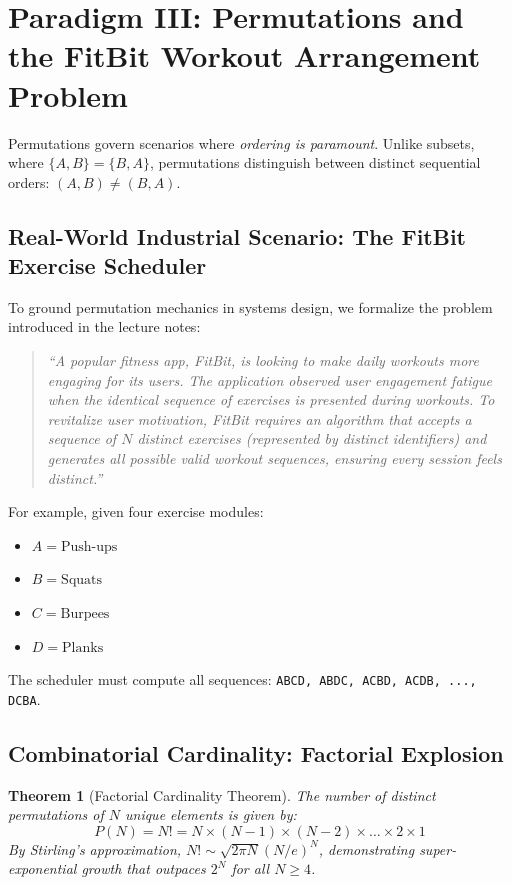 \documentclass[10pt,journal,compsoc,onecolumn]{IEEEtran}
\newtheorem{theorem}{Theorem}
\begin{document}
\section{Paradigm III: Permutations and the FitBit Workout Arrangement Problem}
\label{sec:permutations}

Permutations govern scenarios where \textit{ordering is paramount}. Unlike subsets, where $\{A, B\} = \{B, A\}$, permutations distinguish between distinct sequential orders: $(A, B) \neq (B, A)$.

\subsection{Real-World Industrial Scenario: The FitBit Exercise Scheduler}
To ground permutation mechanics in systems design, we formalize the problem introduced in the lecture notes:
\begin{quote}
\textit{``A popular fitness app, FitBit, is looking to make daily workouts more engaging for its users. The application observed user engagement fatigue when the identical sequence of exercises is presented during workouts. To revitalize user motivation, FitBit requires an algorithm that accepts a sequence of $N$ distinct exercises (represented by distinct identifiers) and generates all possible valid workout sequences, ensuring every session feels distinct.''}
\end{quote}

For example, given four exercise modules:
\begin{itemize}
    \item $A = \text{Push-ups}$
    \item $B = \text{Squats}$
    \item $C = \text{Burpees}$
    \item $D = \text{Planks}$
\end{itemize}
The scheduler must compute all sequences: \texttt{ABCD, ABDC, ACBD, ACDB, ..., DCBA}.

\subsection{Combinatorial Cardinality: Factorial Explosion}
\begin{theorem}[Factorial Cardinality Theorem]
The number of distinct permutations of $N$ unique elements is given by:
\begin{equation}
P(N) = N! = N \times (N-1) \times (N-2) \times \dots \times 2 \times 1
\end{equation}
By Stirling's approximation, $N! \sim \sqrt{2\pi N}(N/e)^N$, demonstrating super-exponential growth that outpaces $2^N$ for all $N \ge 4$.
\end{theorem}
\end{document}
